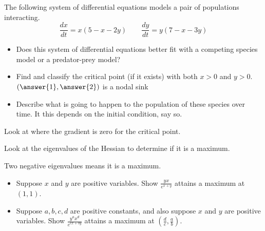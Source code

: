 \documentclass{ximera}
\begin{document}
\begin{exercise}
    The following system of differential equations models a pair of populations interacting. 
    \[ 
        \frac{dx}{dt} = x(5 - x - 2y)\qquad \frac{dy}{dt} = y(7 - x - 3y) 
    \]
    \begin{itemize}
        \item Does this system of differential equations better fit with a competing species model or a predator-prey model? %
            \begin{multipleChoice}
            \end{multipleChoice}
        \item Find and classify the critical point (if it exists) with both $x>0$ and $y>0$. $\left(\answer{1}, \answer{2}\right)$ is a nodal sink
        \item Describe what is going to happen to the population of these species over time. It this depends on the initial condition, say so.
    \end{itemize}
\end{exercise}

\begin{exercise}
    \begin{hint}
        Look at where the gradient is zero for the critical point.
    \end{hint}
    \begin{hint}
        Look at the eigenvalues of the Hessian to determine if it is a maximum.
    \end{hint}
    \begin{hint}
        Two negative eigenvalues means it is a maximum.
    \end{hint}
    \begin{itemize}
        \item Suppose $x$ and $y$ are positive variables.  Show $\frac{y x}{e^{x+y}}$ attains a maximum at $(1,1)$.
        \item Suppose $a,b,c,d$ are positive constants, and also suppose $x$ and $y$ are positive variables.  Show $\frac{y^a x^d}{e^{cx+by}}$ attains a maximum at $(\frac{d}{c},\frac{a}{b})$.
    \end{itemize}
\end{exercise}
\end{document}
